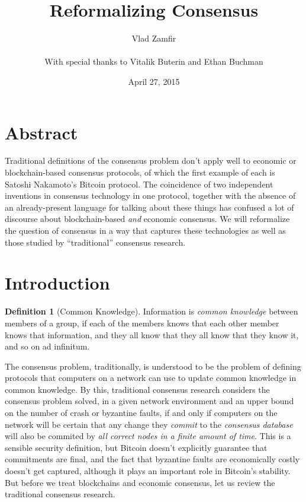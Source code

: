 \documentclass[11pt,a4paper]{article}
\title{Reformalizing Consensus}
\date{April 27, 2015}
\author{Vlad Zamfir \\
 			\\
 			\small With special thanks to Vitalik Buterin and Ethan Buchman}
\theoremstyle{plain}
\theoremstyle{definition}
\newtheorem{defn}{Definition}
\begin{document}
\maketitle
\tableofcontents


\section{Abstract}

Traditional definitions of the consensus problem don't apply well to economic or blockchain-based consensus protocols, of which the first example of each is Satoshi Nakamoto's Bitcoin protocol. The coincidence of two independent inventions in consensus technology in one protocol, together with the absence of an already-present language for talking about these things has confused a lot of discourse about blockchain-based \emph{and} economic consensus. We will reformalize the question of consensus in a way that captures these technologies as well as those studied by ``traditional'' consensus research.

\vspace{0.5cm}


\section{Introduction}

\begin{defn}[Common Knowledge]
Information is \emph{common knowledge} between members of a group, if each of the members knows that each other member knows that information, and they all know that they all know that they know it, and so on ad infinitum.
\end{defn}

The consensus problem, traditionally, is understood to be the problem of defining protocols that computers on a network can use to update common knowledge in common knowledge. By this, traditional consensus research considers the consensus problem solved, in a given network environment and an upper bound on the number of crash or byzantine faults, if and only if computers on the network will be certain that any change they \emph{commit} to the \emph{consensus database} will also be commited by \emph{all correct nodes in a finite amount of time}. This is a sensible security definition, but Bitcoin doesn't explicitly guarantee that commitments are final, and the fact that byzantine faults are economically costly doesn't get captured, although it plays an important role in Bitcoin's stability. But before we treat blockchains and economic consensus, let us review the traditional consensus research.
\end{document}
